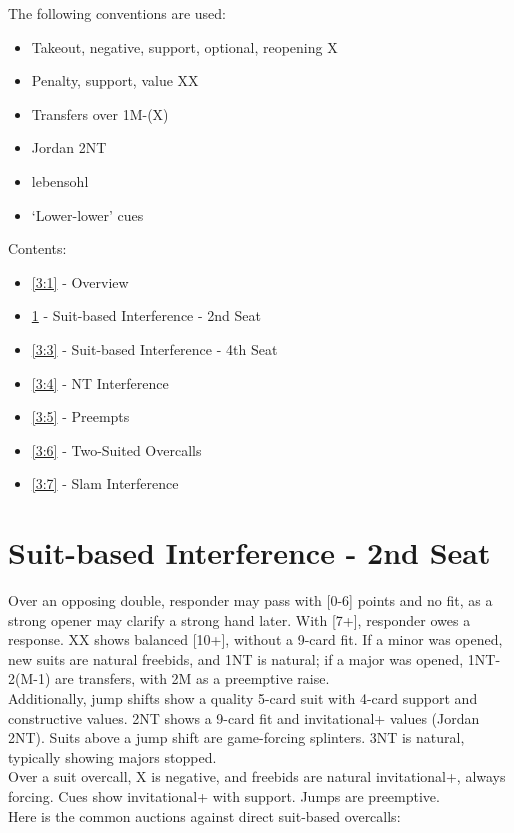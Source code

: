 \documentclass[12pt]{report}
\newcommand{\n}{\\}
\newcommand{\q}[1]{\multido{}{#1}{\qquad}}
\newcommand{\ul}[1]{\begin{itemize}#1\end{itemize}}
\newcommand{\li}[1]{\item[~] \q{#1}}
\begin{document}
The following conventions are used:
\begin{itemize} \itemsep0em
    \item Takeout, negative, support, optional, reopening X
    \item Penalty, support, value XX
    \item Transfers over 1M-(X)
    \item Jordan 2NT
    \item lebensohl
    \item `Lower-lower' cues
\end{itemize}
Contents:
\ul{
    \li0 \ref{3:1} - Overview
    \li0 \ref{3:2} - Suit-based Interference - 2nd Seat
    \li0 \ref{3:3} - Suit-based Interference - 4th Seat
    \li0 \ref{3:4} - NT Interference
    \li0 \ref{3:5} - Preempts
    \li0 \ref{3:6} - Two-Suited Overcalls
    \li0 \ref{3:7} - Slam Interference
}
\newpage

\section{Suit-based Interference - 2nd Seat} \label{3:2}
    
    Over an opposing double, responder may pass with [0-6] points and no fit, as a strong opener may clarify a strong hand later.  With [7+], responder owes a response.  XX shows balanced [10+], without a 9-card fit.  If a minor was opened, new suits are natural freebids, and 1NT is natural; if a major was opened, 1NT-2(M-1) are transfers, with 2M as a preemptive raise.\n

    Additionally, jump shifts show a quality 5-card suit with 4-card support and constructive values.  2NT shows a 9-card fit and invitational+ values (Jordan 2NT).  Suits above a jump shift are game-forcing splinters.  3NT is natural, typically showing majors stopped. \n

    Over a suit overcall, X is negative, and freebids are natural invitational+, always forcing.  Cues show invitational+ with support.  Jumps are preemptive.\n

    Here is the common auctions against direct suit-based overcalls:
    
\end{document}
